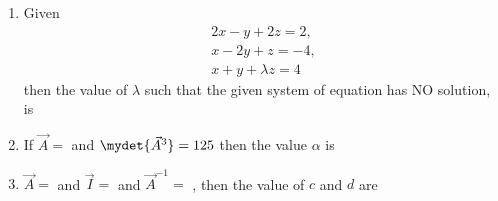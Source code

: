 \begin{enumerate}[label=\thesubsection.\arabic*.,ref=\thesubsection.\theenumi]
\begin{enumerate}
    \end{enumerate}
%
\item  Given \begin{align*} 2x-y+2z=2,\\x-2y+z=-4,\\x+y+\lambda z=4 \end{align*} then the value of $\lambda$ such that the given system of equation has NO solution, is
%
        \hfill{}
        \begin{enumerate}
        \end{enumerate}
    \item If $\vec{A}=$  and $\mydet{\vec{A}^3}=125$ then the value $\alpha$ is
        \hfill{}
        \begin{enumerate}
        \end{enumerate}
%
    \item $\vec{A}=$  and $\vec{I}=$  
        and $\vec{A}^{-1} = $ , then the value of $c$ and $d$ are \hfill{}
        \begin{enumerate}

\end{enumerate}
\end{enumerate}
